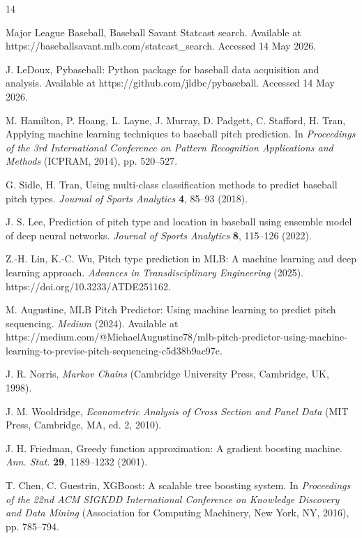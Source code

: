 \documentclass[9pt,twoside]{pnas-new}
\begin{document}
\begin{thebibliography}{14}

Major League Baseball, Baseball Savant Statcast search. Available at https://baseballsavant.mlb.com/statcast\_search. Accessed 14 May 2026.

J. LeDoux, Pybaseball: Python package for baseball data acquisition and analysis. Available at https://github.com/jldbc/pybaseball. Accessed 14 May 2026.

M. Hamilton, P. Hoang, L. Layne, J. Murray, D. Padgett, C. Stafford, H. Tran, Applying machine learning techniques to baseball pitch prediction. In \textit{Proceedings of the 3rd International Conference on Pattern Recognition Applications and Methods} (ICPRAM, 2014), pp. 520--527.

G. Sidle, H. Tran, Using multi-class classification methods to predict baseball pitch types. \textit{Journal of Sports Analytics} \textbf{4}, 85--93 (2018).

J. S. Lee, Prediction of pitch type and location in baseball using ensemble model of deep neural networks. \textit{Journal of Sports Analytics} \textbf{8}, 115--126 (2022).

Z.-H. Lin, K.-C. Wu, Pitch type prediction in MLB: A machine learning and deep learning approach. \textit{Advances in Transdisciplinary Engineering} (2025). https://doi.org/10.3233/ATDE251162.

M. Augustine, MLB Pitch Predictor: Using machine learning to predict pitch sequencing. \textit{Medium} (2024). Available at https://medium.com/@MichaelAugustine78/mlb-pitch-predictor-using-machine-learning-to-previse-pitch-sequencing-c5d38b9ac97c.

J. R. Norris, \textit{Markov Chains} (Cambridge University Press, Cambridge, UK, 1998).

J. M. Wooldridge, \textit{Econometric Analysis of Cross Section and Panel Data} (MIT Press, Cambridge, MA, ed. 2, 2010).

J. H. Friedman, Greedy function approximation: A gradient boosting machine. \textit{Ann. Stat.} \textbf{29}, 1189--1232 (2001).

T. Chen, C. Guestrin, XGBoost: A scalable tree boosting system. In \textit{Proceedings of the 22nd ACM SIGKDD International Conference on Knowledge Discovery and Data Mining} (Association for Computing Machinery, New York, NY, 2016), pp. 785--794.


\end{thebibliography}
\end{document}
